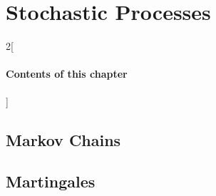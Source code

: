 \chapter{Stochastic Processes}

\begin{multicols}{2}[\subsubsection*{Contents of this chapter}]
\end{multicols}


\section{Markov Chains}

\section{Martingales}

